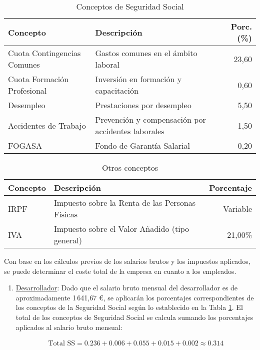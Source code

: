 \begin{enumerate}
		\begin{table}[h]
			\centering
			\begin{tabularx}
				{320}{@{}XXr@{}} \toprule \textbf{Concepto} & \textbf{Descripción} &
				\textbf{Porc. (\%)} \\ \midrule Cuota Contingencias Comunes & Gastos comunes
				en el ámbito laboral & 23,60 \\ Cuota Formación Profesional & Inversión en
				formación y capacitación & 0,60 \\ Desempleo & Prestaciones por desempleo
				& 5,50 \\ Accidentes de Trabajo & Prevención y compensación por accidentes
				laborales & 1,50 \\ FOGASA & Fondo de Garantía Salarial & 0,20 \\ \bottomrule
			\end{tabularx}
			\caption{Conceptos de Seguridad Social}
			\label{tab:seguridad-social}
		\end{table}

		\begin{table}[h]
			\centering
			\begin{tabularx}
				{320}{@{}XXr@{}} \toprule \textbf{Concepto} & \textbf{Descripción} &
				\textbf{Porcentaje} \\ \midrule IRPF & Impuesto sobre la Renta de las Personas
				Físicas & Variable\\ IVA & Impuesto sobre el Valor Añadido (tipo general)
				& 21,00\% \\ \bottomrule
			\end{tabularx}
			\caption{Otros conceptos}
			\label{tab:no-seguridad-social}
		\end{table}

		Con base en los cálculos previos de los salarios brutos y los impuestos
		aplicados, se puede determinar el coste total de la empresa en cuanto a los empleados.

		\begin{enumerate}
			\item \underline{Desarrollador}: Dado que el salario bruto mensual del desarrollador
				es de aproximadamente 1\,641,67 €, se aplicarán los porcentajes
				correspondientes de los conceptos de la Seguridad Social según lo
				establecido en la Tabla \ref{tab:seguridad-social}. El total de los conceptos
				de Seguridad Social se calcula sumando los porcentajes aplicados al salario
				bruto mensual:

				\begin{align*}
					\text{Total SS}= 0.236 + 0.006 + 0.055 + 0.015 + 0.002 \approx 0.314
				\end{align*}


\end{enumerate}
\end{enumerate}
